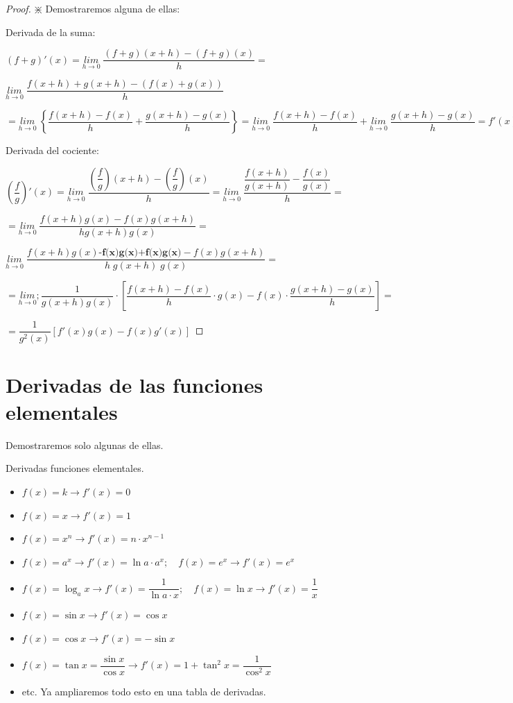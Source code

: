 	\begin{proof}
		
		$\divideontimes$  Demostraremos alguna de ellas:
		
		Derivada de la suma:
		
		$(f+g)'(x)=\underset {h\to 0}{lim}\;{\dfrac {(f+g)(x+h)-(f+g)(x)}{h}}=$
		
		$\underset {h\to 0}{lim}\;{\dfrac {f(x+h)+g(x+h)-(f(x)+g(x))}{h}}$
		
		$=\underset {h\to 0}{lim}\;{\left\{\dfrac {f(x+h)-f(x)}{h}+\dfrac {g(x+h)-g(x)}{h}\right\}}=\underset {h\to 0}{lim}\;{\dfrac {f(x+h)-f(x)}{h}}+ \underset {h\to 0}{lim}\;{\dfrac {g(x+h)-g(x)}{h}}=f'(x)+g'(x)$
		
		Derivada del cociente:
		
		$\left( \dfrac f g \right)'(x)=\underset{h\to 0}{lim}\;
		{ \dfrac { \left(\dfrac{f}{g}\right)(x+h)-\left(\dfrac{f}{g}\right)(x)   }{h}}= \underset {h\to 0}{lim}\;{\dfrac { \dfrac {f(x+h)}{g(x+h)} - \dfrac{f(x)}{g(x)} }{h}}=$
		
		$ =\underset {h\to 0}{lim}\; {\dfrac {f(x+h)g(x)-f(x)g(x+h) }{h g(x+h)g(x)}}= $
		
		$\underset {h\to 0}{lim}\; {\dfrac {f(x+h)g(x) \textbf{-f(x)g(x)+f(x)g(x)}-f(x)g(x+h) }{h \; g(x+h)\; g(x)}}=$
		
		$=\underset {h\to 0}{lim};{\dfrac {1}{g(x+h)g(x)} \cdot \left[ \dfrac {f(x+h)-f(x)}{h}\cdot g(x) - f(x)\cdot \dfrac {g(x+h)-g(x)}{h} \right]}=$
		
		$=\dfrac {1}{g^2(x)}[f'(x)g(x)-f(x)g'(x)]$
		
		
	\end{proof}
	
	\section{Derivadas de las funciones elementales}
	
	Demostraremos solo algunas de ellas.
	
	\begin{teor} Derivadas funciones elementales.
		
		\begin{itemize}
			\item $f(x)=k \to f'(x)=0$
			\item $f(x)=x \to f'(x)=1$
			\item $f(x)=x^n \to f'(x)=n\cdot x^{n-1}$
			\item $f(x)=a^x \to f'(x)=\ln a \cdot a^x; \quad f(x)=e^x \to f'(x)=e^x$
			\item $f(x)=\log_a x \to f'(x)=\dfrac {1}{\ln a \cdot x}; \quad f(x)=\ln x \to f'(x)=\dfrac 1 x$
			\item $f(x)=\sin x \to f'(x)=\cos x$
			\item $f(x)=\cos x \to f'(x)=-\sin x$
			\item $f(x)=\tan x =\dfrac {\sin x}{\cos x}\to f'(x)=1+\tan^2 x= \dfrac {1}{\cos^2 x}$
			\item etc. Ya ampliaremos todo esto en una tabla de derivadas.
		\end{itemize}
		
	\end{teor}

